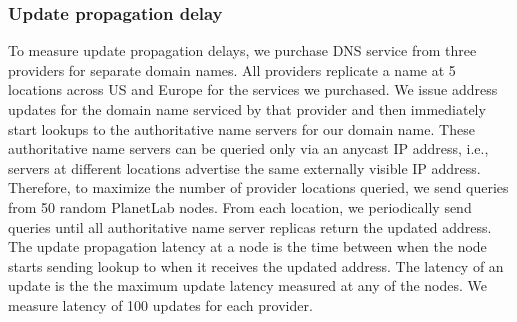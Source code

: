 







\subsubsection{Update propagation delay} 
To measure update propagation delays, we purchase DNS service from three providers for separate domain names.  All providers replicate a name at 5 locations across US and Europe for the services we purchased. We issue address updates for the domain name serviced by that provider and then immediately start lookups to the authoritative name servers for our domain name.
These authoritative name servers can be queried only via an anycast IP address, i.e., servers at different locations advertise the same externally visible IP address. Therefore, to maximize the number of provider locations queried, we send queries from 50 random PlanetLab nodes. From each location, we periodically send queries until all authoritative name server replicas return the updated address.  The update propagation latency at a node is the time between when the node starts sending lookup to when it receives the updated address. The latency of an update is the the maximum update latency measured at any of the nodes. We measure latency of 100 updates for each provider.

